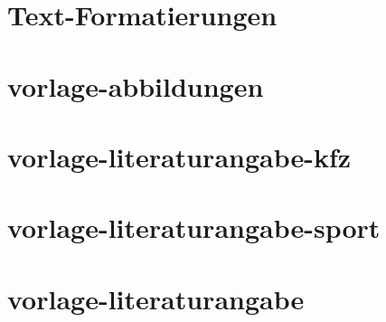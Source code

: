 \chapter{Text-Formatierungen}%

%
\chapter{vorlage-abbildungen}%

%
\chapter{vorlage-literaturangabe-kfz}%

%
\chapter{vorlage-literaturangabe-sport}%

%
\chapter{vorlage-literaturangabe}%

